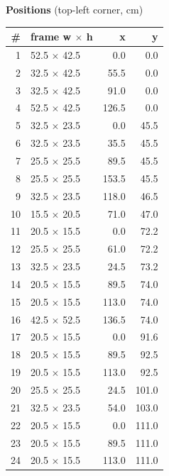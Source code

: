 \documentclass[a4paper,landscape,10pt]{article}
\begin{document}
\begin{minipage}[t]{0.25\textwidth}
\vspace{8pt}
{\bfseries Positions} (top-left corner, cm)\\[2pt]
\tiny
\begin{tabular}{@{}r l r r@{}}
\toprule
\# & frame w $\times$ h & x & y \\
\midrule
1 & 52.5 $\times$ 42.5 & 0.0 & 0.0 \\
2 & 32.5 $\times$ 42.5 & 55.5 & 0.0 \\
3 & 32.5 $\times$ 42.5 & 91.0 & 0.0 \\
4 & 52.5 $\times$ 42.5 & 126.5 & 0.0 \\
5 & 32.5 $\times$ 23.5 & 0.0 & 45.5 \\
6 & 32.5 $\times$ 23.5 & 35.5 & 45.5 \\
7 & 25.5 $\times$ 25.5 & 89.5 & 45.5 \\
8 & 25.5 $\times$ 25.5 & 153.5 & 45.5 \\
9 & 32.5 $\times$ 23.5 & 118.0 & 46.5 \\
10 & 15.5 $\times$ 20.5 & 71.0 & 47.0 \\
11 & 20.5 $\times$ 15.5 & 0.0 & 72.2 \\
12 & 25.5 $\times$ 25.5 & 61.0 & 72.2 \\
13 & 32.5 $\times$ 23.5 & 24.5 & 73.2 \\
14 & 20.5 $\times$ 15.5 & 89.5 & 74.0 \\
15 & 20.5 $\times$ 15.5 & 113.0 & 74.0 \\
16 & 42.5 $\times$ 52.5 & 136.5 & 74.0 \\
17 & 20.5 $\times$ 15.5 & 0.0 & 91.6 \\
18 & 20.5 $\times$ 15.5 & 89.5 & 92.5 \\
19 & 20.5 $\times$ 15.5 & 113.0 & 92.5 \\
20 & 25.5 $\times$ 25.5 & 24.5 & 101.0 \\
21 & 32.5 $\times$ 23.5 & 54.0 & 103.0 \\
22 & 20.5 $\times$ 15.5 & 0.0 & 111.0 \\
23 & 20.5 $\times$ 15.5 & 89.5 & 111.0 \\
24 & 20.5 $\times$ 15.5 & 113.0 & 111.0 \\
\bottomrule
\end{tabular}
\end{minipage}
\clearpage
\end{document}
